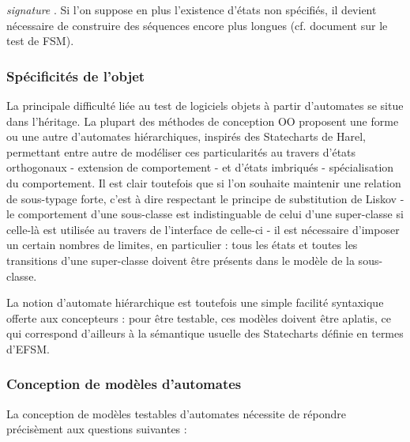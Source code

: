 \emph{signature}
  . Si l'on suppose en plus l'existence
    d'\'etats non sp\'ecifi\'es, il devient n\'ecessaire de construire des
    s\'equences encore plus longues (cf. document sur le test de FSM).
\par
  
\subsubsection{Sp\'ecificit\'es de l'objet}
  La principale difficult\'e li\'ee au test de logiciels objets
    \`a partir d'automates se situe dans l'h\'eritage. La plupart
    des m\'ethodes de conception OO proposent une forme ou une autre
    d'automates hi\'erarchiques, inspir\'es des Statecharts de Harel,
    permettant entre autre de mod\'eliser ces particularit\'es au travers
    d'\'etats orthogonaux - extension de comportement - et d'\'etats
    imbriqu\'es - sp\'ecialisation du comportement. Il est
    clair toutefois que  si l'on souhaite maintenir une relation de
    sous-typage forte, c'est \`a dire respectant le principe de
    substitution de Liskov - le comportement d'une sous-classe est
    indistinguable de celui d'une super-classe si celle-l\`a est utilis\'ee au
    travers de l'interface de celle-ci - il est n\'ecessaire d'imposer
    un certain nombres de limites, en particulier : tous les \'etats et
    toutes les transitions  d'une super-classe doivent \^etre pr\'esents
    dans le mod\`ele de la sous-classe.
    
\par
  
    La notion d'automate hi\'erarchique est toutefois une simple
    facilit\'e syntaxique offerte aux concepteurs : pour \^etre testable,
    ces mod\`eles doivent \^etre aplatis, ce qui correspond d'ailleurs \`a
    la s\'emantique usuelle des Statecharts d\'efinie en termes d'EFSM. 
    
\par
  
\subsubsection{Conception de mod\`eles d'automates}
  La conception de mod\`eles testables d'automates n\'ecessite de
    r\'epondre pr\'ecis\`ement aux questions suivantes :
     
